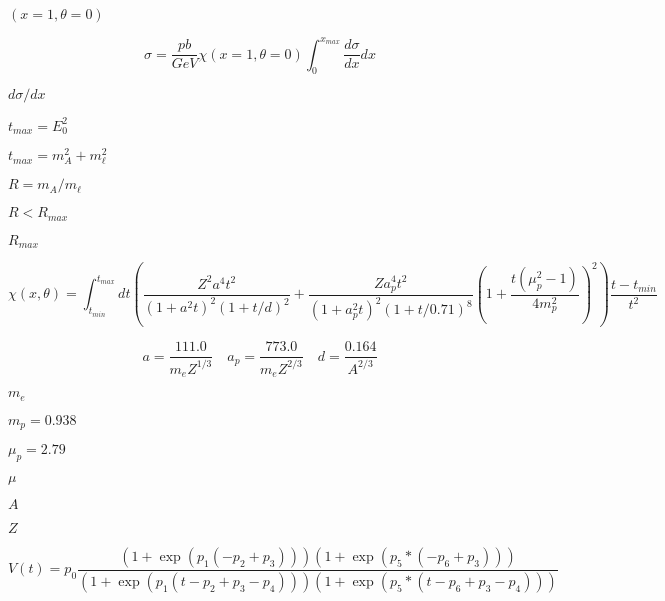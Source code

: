\documentclass{article}
\begin{document}
$(x=1, \theta=0)$
\pagebreak

\begin{equation}
\sigma = \frac{pb}{GeV} \chi(x=1,\theta=0) \int_0^{x_{max}} \frac{d\sigma}{dx} dx
\end{equation}
\pagebreak

$d\sigma/dx$
\pagebreak

$t_{max}=E_0^2$
\pagebreak

$t_{max}=m_A^2+m_\ell^2$
\pagebreak

$R = m_A/m_\ell$
\pagebreak

$R < R_{max}$
\pagebreak

$R_{max}$
\pagebreak

\begin{equation}
\chi(x,\theta) = \int^{t_{max}}_{t_{min}} dt \left( \frac{Z^2a^4t^2}{(1+a^2t)^2(1+t/d)^2}+\frac{Za_p^4t^2}{(1+a_p^2t)^2(1+t/0.71)^8}\left(1+\frac{t(\mu_p^2-1)}{4m_p^2}\right)^2\right)\frac{t-t_{min}}{t^2}
\end{equation}
\pagebreak

\begin{equation}
a = \frac{111.0}{m_e Z^{1/3}}
\quad
a_p = \frac{773.0}{m_e Z^{2/3}}
\quad
d = \frac{0.164}{A^{2/3}}
\end{equation}
\pagebreak

$m_e$
\pagebreak

$m_p = 0.938$
\pagebreak

$\mu_p = 2.79$
\pagebreak

$\mu$
\pagebreak

$A$
\pagebreak

$Z$
\pagebreak

\[
 V(t) =
 p_0\frac{(1+\exp(p_1(-p_2+p_3)))(1+\exp(p_5*(-p_6+p_3)))}
         {(1+\exp(p_1(t-p_2+p_3-p_4)))(1+\exp(p_5*(t-p_6+p_3-p_4)))}
\]
\pagebreak
\end{document}
